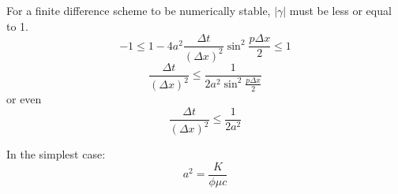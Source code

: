 \documentclass{article}
\begin{document}
For a finite difference scheme to be numerically stable, $|\gamma|$ must be
less or equal to 1.
\begin{equation}
-1 \leq 1 - 4 a^2 \frac{\Delta t}{(\Delta x)^2} \sin^2 \frac{p \Delta x}{2}
\leq 1
\end{equation}
\begin{equation}
\frac{\Delta t}{(\Delta x)^2} \leq \frac{1}{2 a^2 \sin^2 \frac{p \Delta x}{2}}
\end{equation}
or even
\begin{equation}
\frac{\Delta t}{(\Delta x)^2} \leq \frac{1}{2 a^2}
\end{equation}

In the simplest case:
\begin{equation}
a^2 = \frac{K}{\phi \mu c}
\end{equation}


\end{document}
